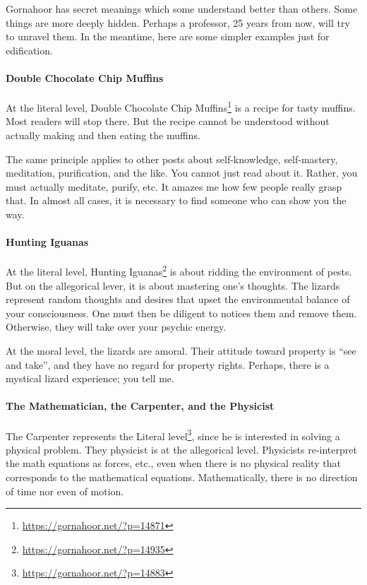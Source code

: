 Gornahoor has secret meanings which some understand better than others. Some things are more deeply hidden. Perhaps a professor, 25 years from now, will try to unravel them. In the meantime, here are some simpler examples just for edification.

\paragraph{Double Chocolate Chip Muffins}


At the literal level, Double Chocolate Chip Muffins\footnote{\url{https://gornahoor.net/?p=14871}} is a recipe for tasty muffins. Most readers will stop there. But the recipe cannot be understood without actually making and then eating the muffins.

The same principle applies to other posts about self-knowledge, self-mastery, meditation, purification, and the like. You cannot just read about it. Rather, you must actually meditate, purify, etc. It amazes me how few people really grasp that. In almost all cases, it is necessary to find someone who can show you the way.

\paragraph{Hunting Iguanas}


At the literal level, Hunting Iguanas\footnote{\url{https://gornahoor.net/?p=14935}} is about ridding the environment of pests. But on the allegorical lever, it is about mastering one's thoughts. The lizards represent random thoughts and desires that upset the environmental balance of your consciousness. One must then be diligent to notices them and remove them. Otherwise, they will take over your psychic energy.

At the moral level, the lizards are amoral. Their attitude toward property is ``see and take'', and they have no regard for property rights. Perhaps, there is a mystical lizard experience; you tell me.

\paragraph{The Mathematician, the Carpenter, and the Physicist}


The Carpenter represents the Literal level\footnote{\url{https://gornahoor.net/?p=14883}}, since he is interested in solving a physical problem. They physicist is at the allegorical level. Physicists re-interpret the math equations as forces, etc., even when there is no physical reality that corresponds to the mathematical equations. Mathematically, there is no direction of time nor even of motion.


